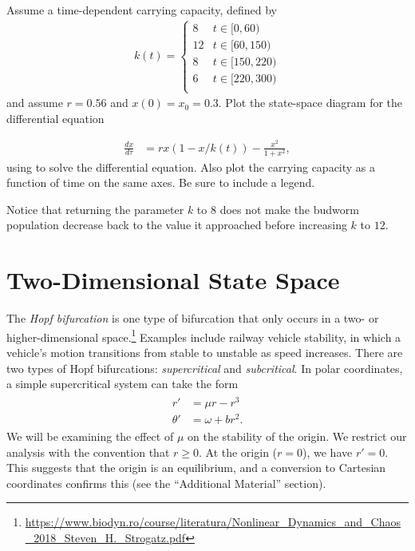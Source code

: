 \begin{problem}
Assume a time-dependent carrying capacity, defined by 
\begin{align*}	
k(t) = \begin{cases}
  8  & t \in [0,60) \\
  12  & t \in [60,150) \\
  8 & t \in [150,220) \\
  6 & t \in [220,300) \\
\end{cases}
\end{align*}
 and assume $r=0.56$ and $x(0)=x_0=0.3$. Plot the state-space diagram for the differential equation

\begin{align*}
	\frac{dx}{d \tau} &= rx(1-x/k(t)) - \frac{x^2}{1+x^2},
\end{align*}
using  to solve the differential equation. Also plot the carrying capacity as a function of time on the same axes.
Be sure to include a legend.

Notice that returning the parameter $k$ to $8$ does not make the budworm population decrease back to the value it approached before increasing $k$ to $12$.

\end{problem} 

\section*{Two-Dimensional State Space}
The \emph{Hopf bifurcation} is one type of bifurcation that only occurs in a two- or higher-dimensional space.\footnote{\url{https://www.biodyn.ro/course/literatura/Nonlinear_Dynamics_and_Chaos_2018_Steven_H._Strogatz.pdf}}
Examples include railway vehicle stability, in which a vehicle's motion transitions from stable to unstable as speed increases.
There are two types of Hopf bifurcations: \emph{supercritical} and \emph{subcritical}.
In polar coordinates, a simple supercritical system can take the form
\begin{align}
    \begin{split}
        \label{hysteresis:eqn:2d-polar}
        r' &= \mu r - r^3 \\
        \theta' &= \omega + b r^2.
    \end{split}
\end{align}
We will be examining the effect of $\mu$ on the stability of the origin.
We restrict our analysis with the convention that $r \ge 0$.
At the origin ($r = 0$), we have $r' = 0$.
This suggests that the origin is an equilibrium, and a conversion to Cartesian coordinates confirms this (see the ``Additional Material'' section).

